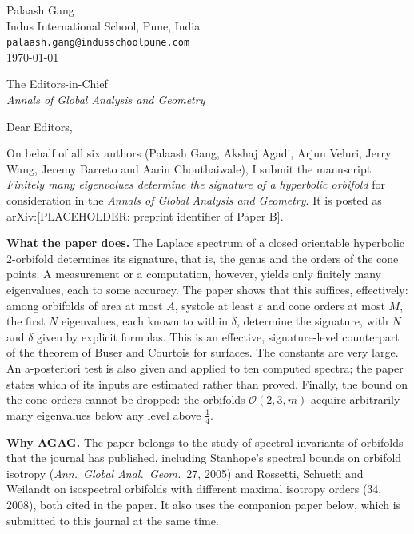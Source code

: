 \documentclass[11pt]{article}
\begin{document}
\begin{flushright}
Palaash Gang\\
Indus International School, Pune, India\\
\texttt{palaash.gang@indusschoolpune.com}\\[6pt]
\today
\end{flushright}

The Editors-in-Chief\\
\emph{Annals of Global Analysis and Geometry}

Dear Editors,

On behalf of all six authors (Palaash Gang, Akshaj Agadi, Arjun Veluri, Jerry Wang, Jeremy Barreto and Aarin Chouthaiwale), I submit the manuscript \emph{Finitely many eigenvalues determine the signature of a hyperbolic orbifold} for consideration in the \emph{Annals of Global Analysis and Geometry}. It is posted as arXiv:[PLACEHOLDER: preprint identifier of Paper B].

\textbf{What the paper does.} The Laplace spectrum of a closed orientable hyperbolic $2$-orbifold determines its signature, that is, the genus and the orders of the cone points. A measurement or a computation, however, yields only finitely many eigenvalues, each to some accuracy. The paper shows that this suffices, effectively: among orbifolds of area at most $A$, systole at least $\varepsilon$ and cone orders at most $M$, the first $N$ eigenvalues, each known to within $\delta$, determine the signature, with $N$ and $\delta$ given by explicit formulas. This is an effective, signature-level counterpart of the theorem of Buser and Courtois for surfaces. The constants are very large. An a-posteriori test is also given and applied to ten computed spectra; the paper states which of its inputs are estimated rather than proved. Finally, the bound on the cone orders cannot be dropped: the orbifolds $\mathcal O(2,3,m)$ acquire arbitrarily many eigenvalues below any level above $\frac14$.

\textbf{Why AGAG.} The paper belongs to the study of spectral invariants of orbifolds that the journal has published, including Stanhope's spectral bounds on orbifold isotropy (\emph{Ann.\ Global Anal.\ Geom.}\ 27, 2005) and Rossetti, Schueth and Weilandt on isospectral orbifolds with different maximal isotropy orders (34, 2008), both cited in the paper. It also uses the companion paper below, which is submitted to this journal at the same time.
\end{document}
